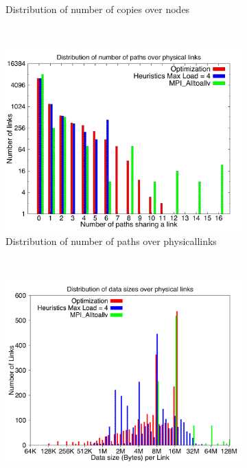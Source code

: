 \begin{figure}[!htbp]
\begin{subfigure}[b]{0.49\textwidth}
                \caption{Distribution of number of copies over nodes}
                \label{fig:3_1024_copy}
        \end{subfigure}
        ~ %
        \begin{subfigure}[b]{0.49\textwidth}
                \includegraphics[width=\textwidth]{report_figures/constantr/3_1024/loadpath_histo.pdf}
                \caption{Distribution of number of paths over physicallinks}
                \label{fig:3_1024_loadpath}
        \end{subfigure}
        ~ %
        \begin{subfigure}[b]{0.49\textwidth}
                \includegraphics[width=\textwidth]{report_figures/constantr/3_1024/loaddata_histo.pdf}

\end{subfigure}
\end{figure}
